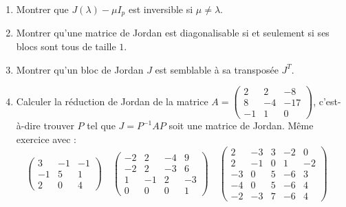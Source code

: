 \documentclass[12pt, class=report,crop=false]{standalone}
\begin{document}
 
\begin{miniexercices}
\sauteligne
\begin{enumerate}
  \item Montrer que $J(\lambda)-\mu I_p$ est inversible si $\mu \neq \lambda$.
  
  \item Montrer qu'une matrice de Jordan est diagonalisable 
  si et seulement si ses blocs sont tous de taille $1$.
  
  \item Montrer qu'un bloc de Jordan $J$ est semblable à sa transposée $J^T$.

  \item Calculer la réduction de Jordan de la matrice 
  $A = \left(\begin{smallmatrix}
  2 & 2 & -8 \\8 & -4 & -17 \\-1 & 1 & 0 \end{smallmatrix}\right)$, 
  c'est-à-dire trouver $P$ tel que $J = P^{-1}AP$ soit une matrice de Jordan.
  Même exercice avec :
  $$
  \left(\begin{smallmatrix} 
  3 & -1 & -1 \\ -1 & 5 & 1 \\ 2 & 0 & 4
  \end{smallmatrix}\right) \quad
  \left(\begin{smallmatrix} 
  -2 & 2 & -4 & 9 \\ -2 & 2 & -3 & 6 \\ 1 & -1 & 2 & -3 \\ 0 & 0 & 0 & 1
  \end{smallmatrix}\right) \quad
  \left(\begin{smallmatrix} 
  2 & -3 & 3 & -2 & 0 \\
  2 & -1 & 0 & 1 & -2 \\
  -3 & 0 & 5 & -6 & 3 \\
  -4 & 0 & 5 & -6 & 4 \\
  -2 & -3 & 7 & -6 & 4
  \end{smallmatrix}\right) \quad
  $$
  
    
  
  
\end{enumerate}
\end{miniexercices}








\finchapitre 
\end{document}
